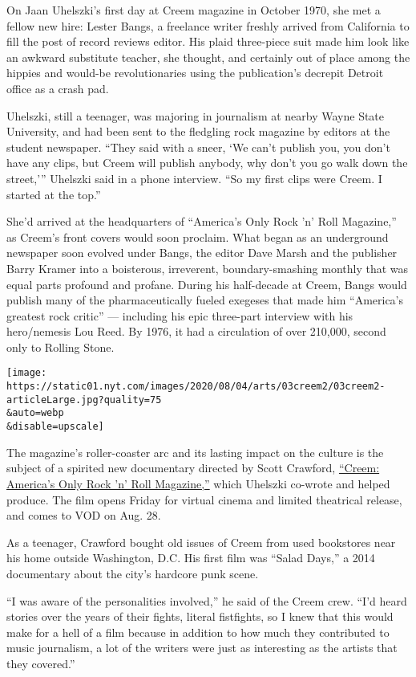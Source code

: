 On Jaan Uhelszki's first day at Creem magazine in October 1970, she met
a fellow new hire: Lester Bangs, a freelance writer freshly arrived from
California to fill the post of record reviews editor. His plaid
three-piece suit made him look like an awkward substitute teacher, she
thought, and certainly out of place among the hippies and would-be
revolutionaries using the publication's decrepit Detroit office as a
crash pad.

Uhelszki, still a teenager, was majoring in journalism at nearby Wayne
State University, and had been sent to the fledgling rock magazine by
editors at the student newspaper. ``They said with a sneer, `We can't
publish you, you don't have any clips, but Creem will publish anybody,
why don't you go walk down the street,''' Uhelszki said in a phone
interview. ``So my first clips were Creem. I started at the top.''

She'd arrived at the headquarters of ``America's Only Rock 'n' Roll
Magazine,'' as Creem's front covers would soon proclaim. What began as
an underground newspaper soon evolved under Bangs, the editor Dave Marsh
and the publisher Barry Kramer into a boisterous, irreverent,
boundary-smashing monthly that was equal parts profound and profane.
During his half-decade at Creem, Bangs would publish many of the
pharmaceutically fueled exegeses that made him ``America's greatest rock
critic'' --- including his epic three-part interview with his
hero/nemesis Lou Reed. By 1976, it had a circulation of over 210,000,
second only to Rolling Stone.

\texttt{[image: https://static01.nyt.com/images/2020/08/04/arts/03creem2/03creem2-articleLarge.jpg?quality=75\\\&auto=webp\\\&disable=upscale]}

The magazine's roller-coaster arc and its lasting impact on the culture
is the subject of a spirited new documentary directed by Scott Crawford,
\href{https://www.creemmag.com/pages/documentary}{``Creem: America's
Only Rock 'n' Roll Magazine,''} which Uhelszki co-wrote and helped
produce. The film opens Friday for virtual cinema and limited theatrical
release, and comes to VOD on Aug. 28.

As a teenager, Crawford bought old issues of Creem from used bookstores
near his home outside Washington, D.C. His first film was ``Salad
Days,'' a 2014 documentary about the city's hardcore punk scene.

``I was aware of the personalities involved,'' he said of the Creem
crew. ``I'd heard stories over the years of their fights, literal
fistfights, so I knew that this would make for a hell of a film because
in addition to how much they contributed to music journalism, a lot of
the writers were just as interesting as the artists that they covered.''

